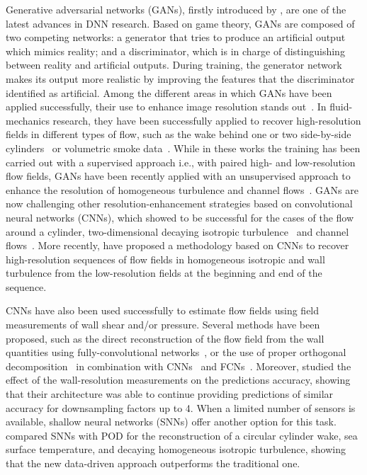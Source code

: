 Generative adversarial networks (GANs), firstly introduced by \citet{goodfellow2014generative}, are one of the latest advances in DNN research.
Based on game theory, GANs are composed of two competing networks: a generator that tries to produce an artificial output which mimics reality; and a discriminator, which is in charge of distinguishing between reality and artificial outputs.
During training, the generator network makes its output more realistic by improving the features that the discriminator identified as artificial.
Among the different areas in which GANs have been applied successfully, their use to enhance image resolution stands out~\citep{ledig2017photo,wang2018esrgan}.
In fluid-mechanics research, they have been successfully applied to recover high-resolution fields in different types of flow, such as the wake behind one or two side-by-side cylinders~\citep{deng2019super} or volumetric smoke data~\citep{werhahn2019multi}.
While in these works the training has been carried out with a supervised approach i.e., with paired high- and low-resolution flow fields, GANs have been recently applied with an unsupervised approach to enhance the resolution of homogeneous turbulence and channel flows~\citep{kim2021unsupervised}.
GANs are now challenging other resolution-enhancement strategies based on convolutional neural networks (CNNs), which showed to be successful for the cases of the flow around a cylinder, two-dimensional decaying isotropic turbulence~\citep{fukami2019super} and channel flows~\citep{liu2020deep}.
More recently, \citet{fukami2021machine} have proposed a methodology based on CNNs to recover high-resolution sequences of flow fields in homogeneous isotropic and wall turbulence from the low-resolution fields at the beginning and end of the sequence.

CNNs have also been used successfully to estimate flow fields using field measurements of wall shear and/or pressure.
Several methods have been proposed, such as the direct reconstruction of the flow field from the wall quantities using fully-convolutional networks~\citep[FCNs, see][]{guastoni2020prediction,guastoni2020convolutional}, or the use of proper orthogonal decomposition~\citep[POD, see][]{lumley1967structure} in combination with CNNs~\citep{guemes2019sensing} and FCNs~\citep{guastoni2020convolutional}.
Moreover, \citet{guemes2019sensing} studied the effect of the wall-resolution measurements on the predictions accuracy, showing that their architecture was able to continue providing predictions of similar accuracy for downsampling factors up to 4.
When a limited number of sensors is available, shallow neural networks (SNNs) offer another option for this task.
\citet{erichson2020shallow} compared SNNs with POD for the reconstruction of a circular cylinder wake, sea surface temperature, and decaying homogeneous isotropic turbulence, showing that the new data-driven approach outperforms the traditional one.

